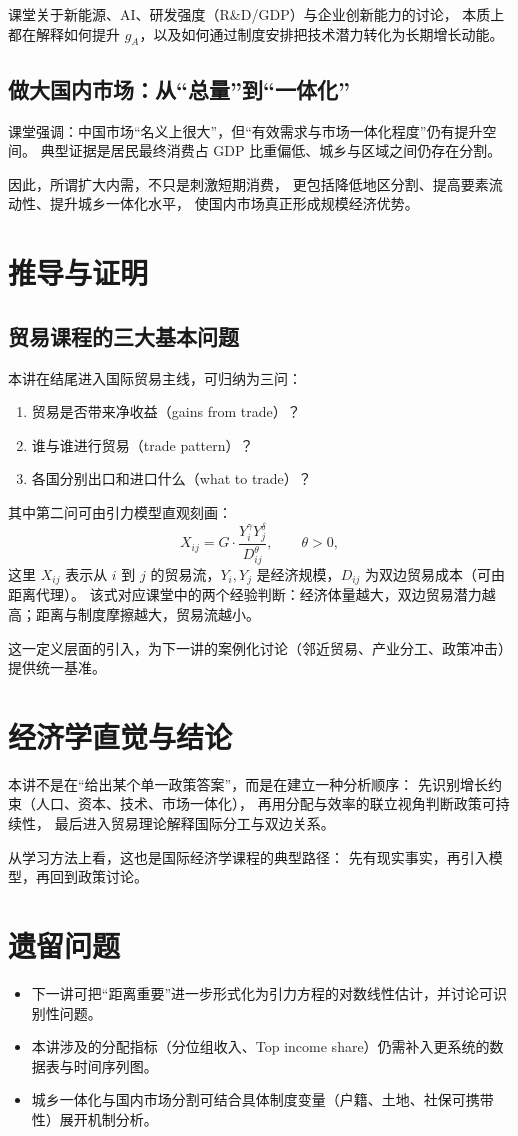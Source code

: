 \documentclass[UTF8,11pt,a4paper]{ctexart}
\begin{document}
课堂关于新能源、AI、研发强度（R\&D/GDP）与企业创新能力的讨论，
本质上都在解释如何提升 $g_A$，以及如何通过制度安排把技术潜力转化为长期增长动能。

\subsection{做大国内市场：从“总量”到“一体化”}

课堂强调：中国市场“名义上很大”，但“有效需求与市场一体化程度”仍有提升空间。
典型证据是居民最终消费占 GDP 比重偏低、城乡与区域之间仍存在分割。

因此，所谓扩大内需，不只是刺激短期消费，
更包括降低地区分割、提高要素流动性、提升城乡一体化水平，
使国内市场真正形成规模经济优势。

\section{推导与证明}

\subsection{贸易课程的三大基本问题}

本讲在结尾进入国际贸易主线，可归纳为三问：
\begin{enumerate}
  \item 贸易是否带来净收益（gains from trade）？
  \item 谁与谁进行贸易（trade pattern）？
  \item 各国分别出口和进口什么（what to trade）？
\end{enumerate}

  其中第二问可由引力模型直观刻画：
\begin{equation}
  X_{ij} = G \cdot \frac{Y_i^{\gamma} Y_j^{\delta}}{D_{ij}^{\theta}}, \qquad \theta > 0,
\end{equation}
这里 $X_{ij}$ 表示从 $i$ 到 $j$ 的贸易流，$Y_i,Y_j$ 是经济规模，$D_{ij}$ 为双边贸易成本（可由距离代理）。
该式对应课堂中的两个经验判断：经济体量越大，双边贸易潜力越高；距离与制度摩擦越大，贸易流越小。

  这一定义层面的引入，为下一讲的案例化讨论（邻近贸易、产业分工、政策冲击）提供统一基准。

\section{经济学直觉与结论}

本讲不是在“给出某个单一政策答案”，而是在建立一种分析顺序：
先识别增长约束（人口、资本、技术、市场一体化），
再用分配与效率的联立视角判断政策可持续性，
最后进入贸易理论解释国际分工与双边关系。

从学习方法上看，这也是国际经济学课程的典型路径：
先有现实事实，再引入模型，再回到政策讨论。

\section{遗留问题}

\begin{itemize}
  \item 下一讲可把“距离重要”进一步形式化为引力方程的对数线性估计，并讨论可识别性问题。
  \item 本讲涉及的分配指标（分位组收入、Top income share）仍需补入更系统的数据表与时间序列图。
  \item 城乡一体化与国内市场分割可结合具体制度变量（户籍、土地、社保可携带性）展开机制分析。
\end{itemize}
\end{document}
